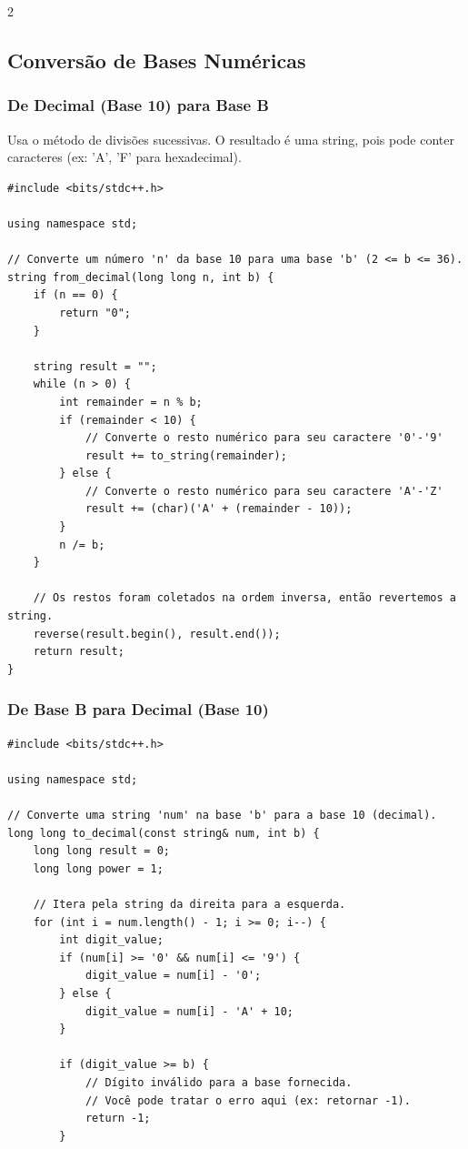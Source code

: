 \documentclass[11pt]{article}
\begin{document}
\begin{multicols}{2}
\subsection{Conversão de Bases Numéricas}

\subsubsection{De Decimal (Base 10) para Base B}
Usa o método de divisões sucessivas. O resultado é uma string, pois pode conter caracteres (ex: 'A', 'F' para hexadecimal).
\begin{lstlisting}
#include <bits/stdc++.h>

using namespace std;

// Converte um número 'n' da base 10 para uma base 'b' (2 <= b <= 36).
string from_decimal(long long n, int b) {
    if (n == 0) {
        return "0";
    }
    
    string result = "";
    while (n > 0) {
        int remainder = n % b;
        if (remainder < 10) {
            // Converte o resto numérico para seu caractere '0'-'9'
            result += to_string(remainder);
        } else {
            // Converte o resto numérico para seu caractere 'A'-'Z'
            result += (char)('A' + (remainder - 10));
        }
        n /= b;
    }
    
    // Os restos foram coletados na ordem inversa, então revertemos a string.
    reverse(result.begin(), result.end());
    return result;
}
\end{lstlisting}

\subsubsection{De Base B para Decimal (Base 10)}
\begin{lstlisting}
#include <bits/stdc++.h>

using namespace std;

// Converte uma string 'num' na base 'b' para a base 10 (decimal).
long long to_decimal(const string& num, int b) {
    long long result = 0;
    long long power = 1;

    // Itera pela string da direita para a esquerda.
    for (int i = num.length() - 1; i >= 0; i--) {
        int digit_value;
        if (num[i] >= '0' && num[i] <= '9') {
            digit_value = num[i] - '0';
        } else {
            digit_value = num[i] - 'A' + 10;
        }

        if (digit_value >= b) {
            // Dígito inválido para a base fornecida.
            // Você pode tratar o erro aqui (ex: retornar -1).
            return -1; 
        }


\end{lstlisting}
\end{multicols}
\end{document}
